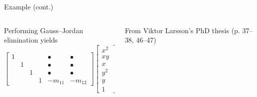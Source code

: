 \documentclass[aspectratio=169]{beamer}
\begin{document}
\begin{frame}[t]{Example (cont.)}
\vspace{1cm}
\begin{columns}
    \begin{column}{0.7\textwidth}
        Performing Gauss--Jordan elimination yields
        \begin{equation*}%
            \begin{bmatrix}
                1&&& & \bullet & \bullet\\
                &1&& & \bullet & \bullet\\
                &&1& & \bullet & \bullet \\
                &&&1 & - m_{11} & -m_{12}
            \end{bmatrix}
            \begin{bmatrix}
                x^2 \\ xy \\ x \\ y^2 \\ y \\ 1
            \end{bmatrix}
            = 0
        \end{equation*}
    \end{column}%
    \begin{column}{0.3\textwidth}
        \centering
        

        \vspace{5mm}

        {\scriptsize From Viktor Larsson's PhD thesis (p. 37--38, 46--47)}
    \end{column}
\end{columns}
\end{frame}
\end{document}
